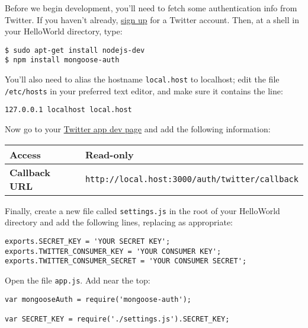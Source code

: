 \documentclass{article}
\begin{document}



Before we begin development, you'll need to fetch some authentication info from Twitter. If you haven't already, \href{http://twitter.com}{sign up} for a Twitter account. Then, at a shell in your HelloWorld directory, type:

\begin{verbatim}
$ sudo apt-get install nodejs-dev
$ npm install mongoose-auth
\end{verbatim}

You'll also need to alias the hostname \verb!local.host! to localhost; edit the file \verb!/etc/hosts! in your preferred text editor, and make sure it contains the line:

\begin{verbatim}
127.0.0.1 localhost local.host
\end{verbatim}

Now go to your \href{https://dev.twitter.com/apps}{Twitter app dev page} and add the following information:

\begin{center}
\begin{tabular}{p{1in} | p{4in}} \hline
\textbf{Access} & Read-only \\ \hline
\textbf{Callback URL} & \verb!http://local.host:3000/auth/twitter/callback! \\ \hline
\end{tabular}
\end{center}

Finally, create a new file called \verb!settings.js! in the root of your HelloWorld directory and add the following lines, replacing as appropriate:

\begin{verbatim}
exports.SECRET_KEY = 'YOUR SECRET KEY';
exports.TWITTER_CONSUMER_KEY = 'YOUR CONSUMER KEY';
exports.TWITTER_CONSUMER_SECRET = 'YOUR CONSUMER SECRET';
\end{verbatim}


Open the file \verb!app.js!. Add near the top:

\begin{verbatim}
var mongooseAuth = require('mongoose-auth');

var SECRET_KEY = require('./settings.js').SECRET_KEY;
\end{verbatim}
\end{document}
